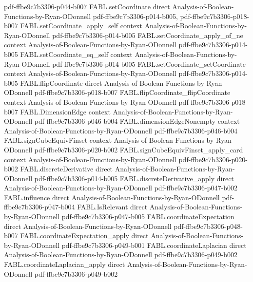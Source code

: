 \begin{theorem}
  {pdf-ffbe9c7b3306-p044-b007}
\proofstep
  {FABL.setCoordinate}
  {direct}
  {Analysis-of-Boolean-Functions-by-Ryan-ODonnell}
  {pdf-ffbe9c7b3306-p014-b005,
    pdf-ffbe9c7b3306-p018-b007}
\proofstep
  {FABL.setCoordinate_apply_self}
  {context}
  {Analysis-of-Boolean-Functions-by-Ryan-ODonnell}
  {pdf-ffbe9c7b3306-p014-b005}
\proofstep
  {FABL.setCoordinate_apply_of_ne}
  {context}
  {Analysis-of-Boolean-Functions-by-Ryan-ODonnell}
  {pdf-ffbe9c7b3306-p014-b005}
\proofstep
  {FABL.setCoordinate_eq_self}
  {context}
  {Analysis-of-Boolean-Functions-by-Ryan-ODonnell}
  {pdf-ffbe9c7b3306-p014-b005}
\proofstep
  {FABL.setCoordinate_setCoordinate}
  {context}
  {Analysis-of-Boolean-Functions-by-Ryan-ODonnell}
  {pdf-ffbe9c7b3306-p014-b005}
\proofstep
  {FABL.flipCoordinate}
  {direct}
  {Analysis-of-Boolean-Functions-by-Ryan-ODonnell}
  {pdf-ffbe9c7b3306-p018-b007}
\proofstep
  {FABL.flipCoordinate_flipCoordinate}
  {context}
  {Analysis-of-Boolean-Functions-by-Ryan-ODonnell}
  {pdf-ffbe9c7b3306-p018-b007}
\proofstep
  {FABL.DimensionEdge}
  {context}
  {Analysis-of-Boolean-Functions-by-Ryan-ODonnell}
  {pdf-ffbe9c7b3306-p046-b004}
\proofstep
  {FABL.dimensionEdgeNonempty}
  {context}
  {Analysis-of-Boolean-Functions-by-Ryan-ODonnell}
  {pdf-ffbe9c7b3306-p046-b004}
\proofstep
  {FABL.signCubeEquivFinset}
  {context}
  {Analysis-of-Boolean-Functions-by-Ryan-ODonnell}
  {pdf-ffbe9c7b3306-p020-b002}
\proofstep
  {FABL.signCubeEquivFinset_apply_card}
  {context}
  {Analysis-of-Boolean-Functions-by-Ryan-ODonnell}
  {pdf-ffbe9c7b3306-p020-b002}
\proofstep
  {FABL.discreteDerivative}
  {direct}
  {Analysis-of-Boolean-Functions-by-Ryan-ODonnell}
  {pdf-ffbe9c7b3306-p014-b005}
\proofstep
  {FABL.discreteDerivative_apply}
  {direct}
  {Analysis-of-Boolean-Functions-by-Ryan-ODonnell}
  {pdf-ffbe9c7b3306-p047-b002}
\proofstep
  {FABL.influence}
  {direct}
  {Analysis-of-Boolean-Functions-by-Ryan-ODonnell}
  {pdf-ffbe9c7b3306-p047-b004}
\proofstep
  {FABL.IsRelevant}
  {direct}
  {Analysis-of-Boolean-Functions-by-Ryan-ODonnell}
  {pdf-ffbe9c7b3306-p047-b005}
\proofstep
  {FABL.coordinateExpectation}
  {direct}
  {Analysis-of-Boolean-Functions-by-Ryan-ODonnell}
  {pdf-ffbe9c7b3306-p048-b007}
\proofstep
  {FABL.coordinateExpectation_apply}
  {direct}
  {Analysis-of-Boolean-Functions-by-Ryan-ODonnell}
  {pdf-ffbe9c7b3306-p049-b001}
\proofstep
  {FABL.coordinateLaplacian}
  {direct}
  {Analysis-of-Boolean-Functions-by-Ryan-ODonnell}
  {pdf-ffbe9c7b3306-p049-b002}
\proofstep
  {FABL.coordinateLaplacian_apply}
  {direct}
  {Analysis-of-Boolean-Functions-by-Ryan-ODonnell}
  {pdf-ffbe9c7b3306-p049-b002}

\end{theorem}
